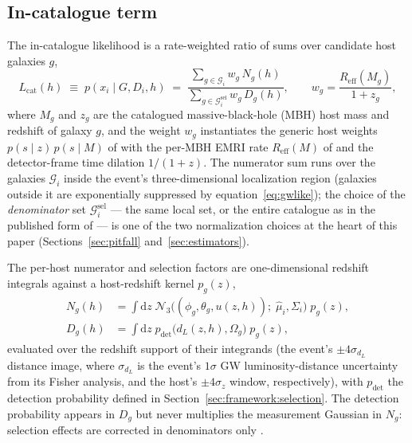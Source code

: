 \subsection{In-catalogue term}
\label{sec:framework:incat}

The in-catalogue likelihood is a rate-weighted ratio of sums over
candidate host galaxies $g$,
\begin{equation}
  L_\mathrm{cat}(h) \;\equiv\; p(x_i \mid G, D_i, h)
  \;=\;
  \frac{\displaystyle\sum_{g \in \mathcal{G}_i} w_g\, N_g(h)}
       {\displaystyle\sum_{g \in \mathcal{G}_i^{\mathrm{sel}}} w_g\, D_g(h)},
  \qquad
  w_g = \frac{R_\mathrm{eff}(M_g)}{1 + z_g},
  \label{eq:lcat}
\end{equation}
where $M_g$ and $z_g$ are the catalogued massive-black-hole (MBH) host
mass and redshift of galaxy $g$, and the weight $w_g$ instantiates the
generic host weights $p(s\mid z)\,p(s\mid M)$ of \citet{Gray:2019ksv}
with the per-MBH EMRI rate $R_\mathrm{eff}(M)$ of \citet{Babak:2017tow}
and the detector-frame time dilation $1/(1+z)$.  The numerator sum
runs over the galaxies $\mathcal{G}_i$ inside the event's
three-dimensional localization region (galaxies outside it are
exponentially suppressed by equation~\eqref{eq:gwlike}); the choice of
the \emph{denominator} set $\mathcal{G}_i^{\mathrm{sel}}$ --- the same local
set, or the entire catalogue as in the published form of
\citet{Gray:2019ksv} --- is one of the two normalization choices at
the heart of this paper (Sections~\ref{sec:pitfall}
and~\ref{sec:estimators}).

The per-host numerator and selection factors are one-dimensional
redshift integrals against a host-redshift kernel $p_g(z)$,
\begin{align}
  N_g(h) &= \int \mathrm{d}z\;
  \mathcal{N}_3\!\big( (\phi_g, \theta_g, u(z,h));\; \hat\mu_i, \Sigma_i \big)\;
  p_g(z),
  \label{eq:ng}\\
  D_g(h) &= \int \mathrm{d}z\;
  p_\mathrm{det}\!\big(d_L(z,h), \Omega_g\big)\;
  p_g(z),
  \label{eq:dg}
\end{align}
evaluated over the redshift support of their integrands (the event's
$\pm 4\sigma_{d_L}$ distance image, where $\sigma_{d_L}$ is the
event's $1\sigma$ GW luminosity-distance uncertainty from its Fisher
analysis, and the host's $\pm 4\sigma_z$ window, respectively), with
$p_\mathrm{det}$ the detection probability
defined in Section~\ref{sec:framework:selection}.  The detection
probability appears in $D_g$ but never multiplies the measurement
Gaussian in $N_g$: selection effects are corrected in denominators
only \citep{Mandel:2018mve}.

